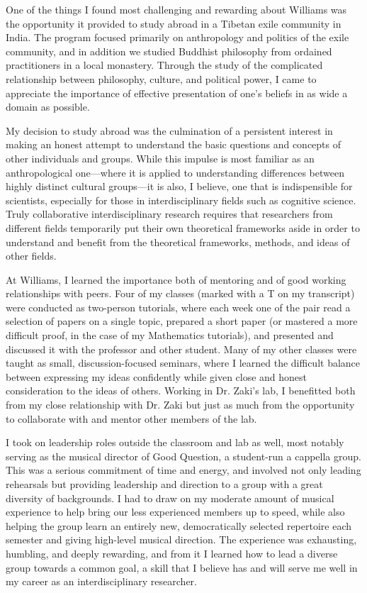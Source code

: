 \documentclass[12pt]{article}
\begin{document}
One of the things I found most challenging and rewarding about Williams was the opportunity it provided to study abroad in a Tibetan exile community in India.  The program focused primarily on anthropology and politics of the exile community, and in addition we studied Buddhist philosophy from ordained practitioners in a local monastery.  Through the study of the complicated relationship between philosophy, culture, and political power, I came to appreciate the importance of effective presentation of one's beliefs in as wide a domain as possible.

My decision to study abroad was the culmination of a persistent interest in making an honest attempt to understand the basic questions and concepts of other individuals and groups.  While this impulse is most familiar as an anthropological one---where it is applied to understanding differences between highly distinct cultural groups---it is also, I believe, one that is indispensible for scientists, especially for those in interdisciplinary fields such as cognitive science.  Truly collaborative interdisciplinary research requires that researchers from different fields temporarily put their own theoretical frameworks aside in order to understand and benefit from the theoretical frameworks, methods, and ideas of other fields.  


At Williams, I learned the importance both of mentoring and of good working relationships with peers.  Four of my classes (marked with a T on my transcript) were conducted as two-person tutorials, where each week one of the pair read a selection of papers on a single topic, prepared a short paper (or mastered a more difficult proof, in the case of my Mathematics tutorials), and presented and discussed it with the professor and other student.  
Many of my other classes were taught as small, discussion-focused seminars, where I learned the difficult balance between expressing my ideas confidently while given close and honest consideration to the ideas of others.  
 Working in Dr. Zaki's lab, I benefitted both from my close relationship with Dr. Zaki but just as much from the opportunity to collaborate with and mentor other members of the lab.  

I took on leadership roles outside the classroom and lab as well, most notably serving as the musical director of Good Question, a student-run a cappella group.  This was a serious commitment of time and energy, and involved not only leading rehearsals but providing leadership and direction to a group with a great diversity of backgrounds.  I had to draw on my moderate amount of musical experience to help bring our less experienced members up to speed, while also helping the group learn an entirely new, democratically selected repertoire each semester and giving high-level musical direction.  The experience was exhausting, humbling, and deeply rewarding, and from it I learned how to lead a diverse group towards a common goal, a skill that I believe has and will serve me well in my career as an interdisciplinary researcher.
\end{document}
